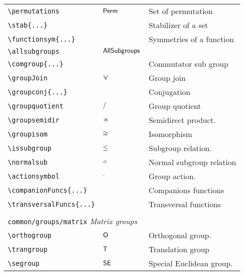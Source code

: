 \begin{longtable}{lll}
 {\color[rgb]{0.5,0.5,0.5}\texttt{\textbackslash permutations}} & $\mathsf{Perm}$ &  Set of permutation\\ 
 {\color[rgb]{0.5,0.5,0.5}\texttt{\textbackslash stab\{...\}}} &  &  Stabilizer of a set\\ 
 {\color[rgb]{0.5,0.5,0.5}\texttt{\textbackslash functionsym\{...\}}} &  &  Symmetries of a function\\ 
 {\color[rgb]{0.5,0.5,0.5}\texttt{\textbackslash allsubgroups}} & $\mathsf{AllSubgroups}$ & \\ 
 {\color[rgb]{0.5,0.5,0.5}\texttt{\textbackslash comgroup\{...\}}} &  &  Commutator sub group\\ 
 {\color[rgb]{0.5,0.5,0.5}\texttt{\textbackslash groupJoin}} & $\boldsymbol{\vee}$ &  Group join\\ 
 {\color[rgb]{0.5,0.5,0.5}\texttt{\textbackslash groupconj\{...\}}} &  &  Conjugation\\ 
 {\color[rgb]{0.5,0.5,0.5}\texttt{\textbackslash groupquotient}} & $\mathrel{/}$ &  Group quotient\\ 
 {\color[rgb]{0.5,0.5,0.5}\texttt{\textbackslash groupsemidir}} & $\mathrel{\rtimes}$ &  Semidirect product.\\ 
 {\color[rgb]{0.5,0.5,0.5}\texttt{\textbackslash groupisom}} & $\mathrel{\cong}$ &  Isomorphism\\ 
 {\color[rgb]{0.5,0.5,0.5}\texttt{\textbackslash issubgroup}} & $\mathrel{\leq}$ &  Subgroup relation.\\ 
 {\color[rgb]{0.5,0.5,0.5}\texttt{\textbackslash normalsub}} & $\mathrel{\triangleleft}$ &  Normal subgroup relation\\ 
 {\color[rgb]{0.5,0.5,0.5}\texttt{\textbackslash actionsymbol}} & $\mathrel{\cdot}$ &  Group action.\\ 
 {\color[rgb]{0.5,0.5,0.5}\texttt{\textbackslash companionFuncs\{...\}}} &  &  Companions functions\\ 
 {\color[rgb]{0.5,0.5,0.5}\texttt{\textbackslash transversalFuncs\{...\}}} &  &  Transversal functions\\ 
  &  & \\ 
 \multicolumn{3}{l}{{\color[rgb]{0.5,0.5,0.5}\texttt{common/groups/matrix}} \emph{Matrix groups}}\\ 
 \hline
{\color[rgb]{0.5,0.5,0.5}\texttt{\textbackslash orthogroup}} & $\mathsf{O}$ &  Orthogonal group.\\ 
 {\color[rgb]{0.5,0.5,0.5}\texttt{\textbackslash trangroup}} & $\mathsf{T}$ &   Translation group\\ 
 {\color[rgb]{0.5,0.5,0.5}\texttt{\textbackslash segroup}} & $\mathsf{SE}$ &  Special Euclidean group.\\ 

\end{longtable}
